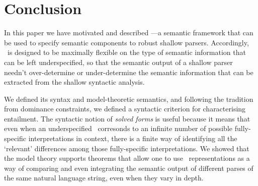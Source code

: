 \section{Conclusion}
\label{sec:conclusion}

In this paper we have motivated and described \rmrs---a semantic
framework that can be used to specify
semantic components to robust shallow parsers.  Accordingly, \rmrs\
is designed to be
maximally flexible on the type of semantic information
that can be left underspecified, so that the semantic output of a
shallow parser needn't over-determine or under-determine the semantic
information that can be extracted from the shallow syntactic analysis.

We defined its syntax and model-theoretic semantics, and following the
tradition from dominance constraints, we defined a syntactic criterion
for characterising entailment.  The syntactic notion of {\em solved
  forms} is useful because it means that even when an underspecified
\rmrs\ corresonds to an infinite number of possible fully-specific
interpretations in context, there is a finite way of identifying all
the `relevant' differences among those fully-specific interpretations.
We showed that the model theory supports theorems that allow one to
use \rmrs\ representations as a way of comparing and even integrating
the semantic output of different parses of the same natural language
string, even when they vary in depth.

